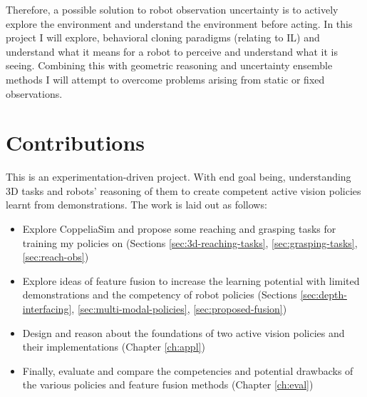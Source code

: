  Therefore, a possible solution to robot observation uncertainty is to actively explore the environment and understand the environment before acting. In this project I will explore, behavioral cloning paradigms (relating to IL) and understand what it means for a robot to perceive and understand what it is seeing. Combining this with geometric reasoning and uncertainty ensemble methods I will attempt to overcome problems arising from static or fixed observations.

\section{Contributions}
  This is an experimentation-driven project. With end goal being, understanding 3D tasks and robots' reasoning of them to create competent active vision policies learnt from demonstrations. The work is laid out as follows:

  \begin{itemize}
    \item Explore CoppeliaSim and propose some reaching and grasping tasks for training my policies on (Sections \ref{sec:3d-reaching-tasks}, \ref{sec:grasping-tasks}, \ref{sec:reach-obs})
    \item Explore ideas of feature fusion to increase the learning potential with limited demonstrations and the competency of robot policies (Sections \ref{sec:depth-interfacing}, \ref{sec:multi-modal-policies}, \ref{sec:proposed-fusion})
    \item Design and reason about the foundations of two active vision policies and their implementations (Chapter \ref{ch:appl})
    \item Finally, evaluate and compare the competencies and potential drawbacks of the various policies and feature fusion methods (Chapter \ref{ch:eval})
  \end{itemize}

